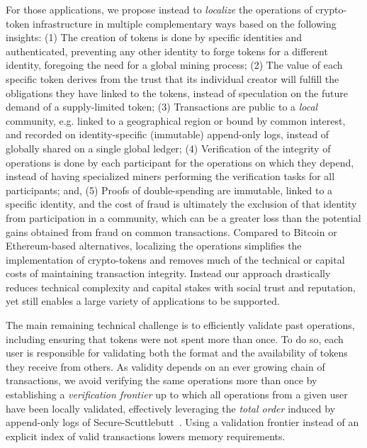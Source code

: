 \documentclass[sigplan,screen,10pt]{acmart}
\begin{document}
For those applications, we propose instead to \textit{localize} the operations of crypto-token infrastructure in multiple complementary ways based on the following insights: (1) The creation of tokens is done by specific identities and authenticated, preventing any other identity to forge tokens for a different identity, foregoing the need for a global mining process; (2) The value of each specific token derives from the trust that its individual creator will fulfill the obligations they have linked to the tokens, instead of speculation on the future demand of a supply-limited token; (3) Transactions are public to a \textit{local} community, e.g. linked to a geographical region or bound by common interest, and recorded on identity-specific (immutable) append-only logs, instead of globally shared on a single global ledger; (4) Verification of the integrity of operations is done by each participant for the operations on which they depend, instead of having specialized miners performing the verification tasks for all participants; and, (5) Proofs of double-spending are immutable, linked to a specific identity, and the cost of fraud is ultimately the exclusion of that identity from participation in a community, which can be a greater loss than the potential gains obtained from fraud on common transactions. Compared to Bitcoin or Ethereum-based alternatives, localizing the operations simplifies the implementation of crypto-tokens and removes much of the technical or capital costs of maintaining transaction integrity. Instead our approach drastically reduces technical complexity and capital stakes with social trust and reputation, yet still enables a large variety of applications to be supported.

The main remaining technical challenge is to efficiently validate past operations, including ensuring that tokens were not spent more than once. To do so, each user is responsible for validating both the format and the availability of tokens they receive from others. 
As validity depends on an ever growing chain of transactions, we avoid verifying the same operations more than once by establishing a \textit{verification frontier} up to which all operations from a given user have been locally validated, effectively leveraging the \textit{total order} induced by append-only logs of Secure-Scuttlebutt~\cite{kermarrec2020gossiping}. Using a validation frontier instead of an explicit index of valid transactions lowers memory requirements.
\end{document}
